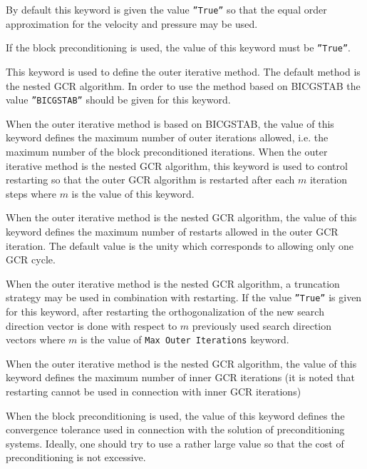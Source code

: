 By default this keyword is given the value {\tt ''True''} so that
the equal order approximation for the velocity and pressure may be used.

If the block preconditioning is used, the value of this keyword must 
be {\tt ''True''}. 

This keyword is used to define the outer iterative method.
The default method is the nested GCR algorithm. 
In order to use the method based on BICGSTAB the value {\tt ''BICGSTAB''} should be given
for this keyword.  

When the outer iterative method is based on BICGSTAB,
the value of this keyword defines the maximum number of outer iterations allowed,
i.e. the maximum number of the block preconditioned  
iterations. When the outer iterative method is 
the nested GCR algorithm, this keyword is used to
control restarting so that the outer GCR algorithm is restarted
after each $m$ iteration steps where $m$ is the value of this keyword.

When the outer iterative method is
the nested GCR algorithm, the value of this keyword defines the maximum number
of restarts allowed in the outer GCR iteration. 
The default value is the unity which corresponds to allowing only one
GCR cycle.

When the outer iterative method is the nested GCR algorithm,
a truncation strategy may be used in combination with restarting.
If the value {\tt ''True''} is given for this keyword, after restarting
the orthogonalization of the new search direction vector is done
with respect to $m$ previously used search direction vectors where
$m$ is the value of {\tt Max Outer Iterations}
keyword.

When the outer iterative method is the nested GCR algorithm, 
the value of this keyword defines the maximum number
of inner GCR iterations (it is noted that restarting cannot be used 
in connection with inner GCR iterations)

When the block preconditioning is used, the value of this keyword defines
the convergence tolerance used in connection with the solution of preconditioning systems.
Ideally, one should try to use a rather large value so that
the cost of preconditioning is not excessive.  

